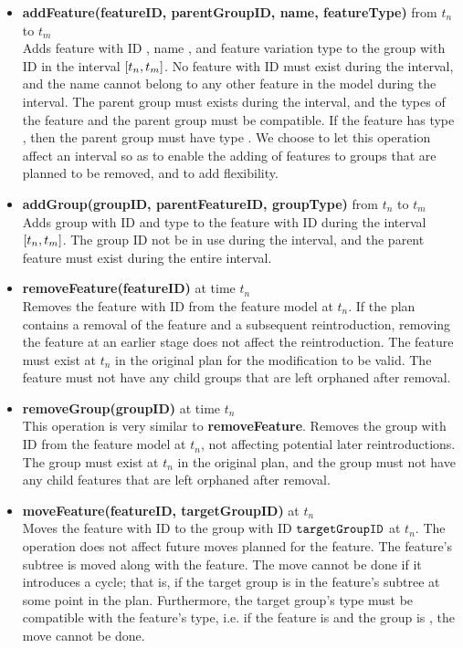 \begin{itemize}
  \item \textbf{addFeature(featureID, parentGroupID, name, featureType)} from $t_n$ to $t_m$\\
    Adds feature with ID , name , and feature variation type  to the group with ID  in the interval $\interval{t_n}{t_m}$. No feature with ID  must exist during the interval, and the name cannot belong to any other feature in the model during the interval. The parent group must exists during the interval, and the types of the feature and the parent group must be compatible. If the feature has type \mandatory{}, then the parent group must have type \andtype{}. We choose to let this operation affect an interval so as to enable the adding of features to groups that are planned to be removed, and to add flexibility.
  \item \textbf{addGroup(groupID, parentFeatureID, groupType)} from $t_n$ to $t_m$\\
    Adds group with ID  and type  to the feature with ID  during the interval $\interval{t_n}{t_m}$. The group ID not be in use during the interval, and the parent feature must exist during the entire interval. 
  \item \textbf{removeFeature(featureID)} at time $t_n$\\
    Removes the feature with ID  from the feature model at $t_n$. If the plan contains a removal of the feature and a subsequent reintroduction, removing the feature at an earlier stage does not affect the reintroduction. The feature must exist at $t_n$ in the original plan for the modification to be valid. The feature must not have any child groups that are left orphaned after removal. 
  \item \textbf{removeGroup(groupID)} at time $t_n$\\
    This operation is very similar to \textbf{removeFeature}. Removes the group with ID  from the feature model at $t_n$, not affecting potential later reintroductions. The group must exist at $t_n$ in the original plan, and the group must not have any child features that are left orphaned after removal. 
  \item \textbf{moveFeature(featureID, targetGroupID)} at $t_n$\\
    Moves the feature with ID  to the group with ID $\texttt{targetGroupID}$ at $t_n$. The operation does not affect future moves planned for the feature. The feature's subtree is moved along with the feature. The move cannot be done if it introduces a cycle; that is, if the target group is in the feature's subtree at some point in the plan. Furthermore, the target group's type must be compatible with the feature's type, i.e. if the feature is \mandatory{} and the group is \optional{}, the move cannot be done.

\end{itemize}
